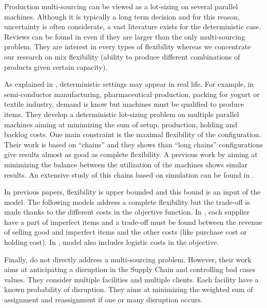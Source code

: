 Production multi-sourcing can be viewed as a lot-sizing on several parallel machines.
Although it is typically a long term decision and for this reason, uncertainty is often considerate, a vast literature exists for the deterministic case.
Reviews can be found in \citet{Sethi1990,Koste1999,Stevenson2007} even if they are larger than the only multi-sourcing problem.
They are interest in every types of flexibility whereas we concentrate our research on mix flexibility (ability to produce different combinations of products given certain capacity).


As explained in \citet{Fiorotto2018}, deterministic settings may appear in real life.
For example, in semi-conductor manufacturing, pharmaceutical production, packing for yogurt or textile industry, demand is know but machines must be qualified to produce items.
They develop a deterministic lot-sizing problem on multiple parallel machines aiming at minimizing the sum of setup, production, holding and backlog costs.
One main constraint is the maximal flexibility of the configuration.
Their work is based on ``chains'' and they shows than ``long chains'' configurations give results almost as good as complete flexibility.
A previous work by \citet{Ignizio2009} aiming at minimizing the balance between the utilization of the machines shows similar results.
An extensive study of this chains based on simulation can be found in \citet{Muriel2006}.


In previous papers, flexibility is upper bounded and this bound is an input of the model.
The following models address a complete flexibility but the trade-off is made thanks to the different costs in the objective function.
In \citet{Rezaei2008}, each supplier have a part of imperfect items and a trade-off must be found between the revenue of selling good and imperfect items and the other costs (like purchase cost or holding cost).
In \citet{Woarawichai2017}, model also includes logistic costs in the objective.


Finally, \citet{Snyder2006b} do not directly address a multi-sourcing problem.
However, their work aims at anticipating a disruption in the Supply Chain and controlling bad cases values.
They consider multiple facilities and multiple clients.
Each facility have a known probability of disruption.
They aims at minimizing the weighted sum of assignment and reassignment if one or many disruption occurs.




